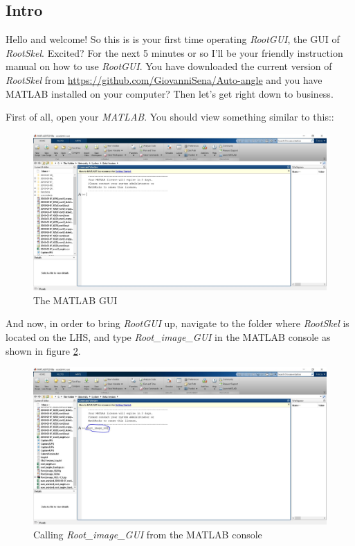 \subsection{Intro}

Hello and welcome! 
So this is is your first time operating \textit{RootGUI}, the GUI of \textit{RootSkel}. Excited?
For the next 5 minutes or so I'll be your friendly instruction manual on how to use \textit{RootGUI}. 
You have downloaded the current version of \textit{RootSkel} from \url{https://github.com/GiovanniSena/Auto-angle} and you have MATLAB installed on your computer? Then let's get right down to business.

First of all, open your \textit{MATLAB}. You should view something similar to this::
\begin{figure}[H]
	\centering
	\includegraphics[width=\textwidth]{../Figures/manual/intro1.jpg}
	\caption{The MATLAB GUI}
	\label{fig:img1}
\end{figure}

And now, in order to bring \textit{RootGUI} up, navigate to the folder where \textit{RootSkel} is located on the LHS, and type \textit{Root\_image\_GUI} in the MATLAB console as shown in figure \ref{fig:img2}.
\begin{figure}[H]
	\centering
	\includegraphics[width=\textwidth]{../Figures/manual/intro2.jpg}
	\caption{Calling \textit{Root\_image\_GUI} from the MATLAB console}
	\label{fig:img2}
\end{figure}

